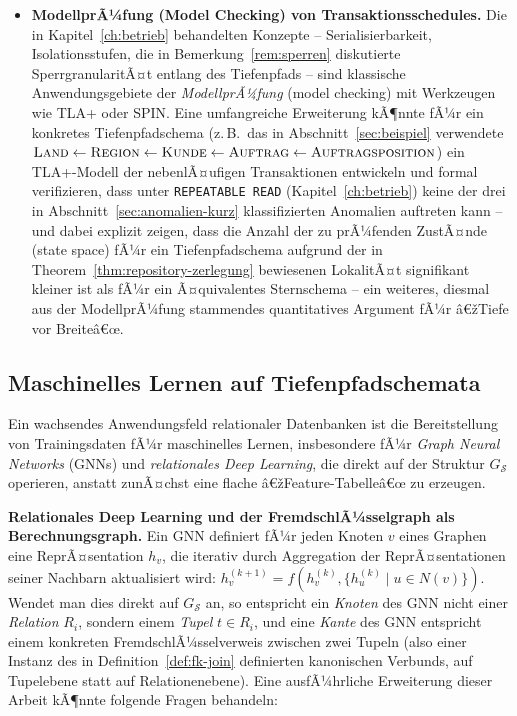 ﻿\documentclass[a4paper,12pt]{report}
\theoremstyle{definition}
\theoremstyle{remark}
\begin{document}
\begin{itemize}
  \item \textbf{ModellprÃ¼fung (Model Checking) von
    Transaktionsschedules.} Die in Kapitel~\ref{ch:betrieb}
    behandelten Konzepte -- Serialisierbarkeit, Isolationsstufen,
    die in Bemerkung~\ref{rem:sperren} diskutierte
    SperrgranularitÃ¤t entlang des Tiefenpfads -- sind klassische
    Anwendungsgebiete der \emph{ModellprÃ¼fung} (model checking) mit
    Werkzeugen wie TLA+ oder SPIN. Eine umfangreiche Erweiterung
    kÃ¶nnte fÃ¼r ein konkretes Tiefenpfadschema (z.\,B.\ das in
    Abschnitt~\ref{sec:beispiel} verwendete
    $\textsc{Land}\leftarrow\textsc{Region}\leftarrow\textsc{Kunde}
    \leftarrow\textsc{Auftrag}\leftarrow\textsc{Auftragsposition}$)
    ein TLA+-Modell der nebenlÃ¤ufigen Transaktionen entwickeln und
    formal verifizieren, dass unter \texttt{REPEATABLE READ}
    (Kapitel~\ref{ch:betrieb}) keine der drei in
    Abschnitt~\ref{sec:anomalien-kurz} klassifizierten Anomalien
    auftreten kann -- und dabei explizit zeigen, dass die Anzahl der
    zu prÃ¼fenden ZustÃ¤nde (state space) fÃ¼r ein Tiefenpfadschema
    aufgrund der in Theorem~\ref{thm:repository-zerlegung} bewiesenen
    LokalitÃ¤t signifikant kleiner ist als fÃ¼r ein Ã¤quivalentes
    Sternschema -- ein weiteres, diesmal aus der ModellprÃ¼fung
    stammendes quantitatives Argument fÃ¼r â€žTiefe vor Breiteâ€œ.
\end{itemize}

\subsection{Maschinelles Lernen auf Tiefenpfadschemata}
\label{sec:ausblick-ml}

Ein wachsendes Anwendungsfeld relationaler Datenbanken ist die
Bereitstellung von Trainingsdaten fÃ¼r maschinelles Lernen,
insbesondere fÃ¼r \emph{Graph Neural Networks} (GNNs) und
\emph{relationales Deep Learning}, die direkt auf der Struktur
$G_{\mathcal{S}}$ operieren, anstatt zunÃ¤chst eine flache
â€žFeature-Tabelleâ€œ zu erzeugen.

\textbf{Relationales Deep Learning und der FremdschlÃ¼sselgraph als
Berechnungsgraph.} Ein GNN definiert fÃ¼r jeden Knoten $v$ eines
Graphen eine ReprÃ¤sentation $h_v$, die iterativ durch Aggregation der
ReprÃ¤sentationen seiner Nachbarn aktualisiert wird:
$h_v^{(k+1)} = f(h_v^{(k)}, \{h_u^{(k)} \mid u \in
N(v)\})$. Wendet man dies direkt auf $G_{\mathcal{S}}$ an, so
entspricht ein \emph{Knoten} des GNN nicht einer \emph{Relation}
$R_i$, sondern einem \emph{Tupel} $t\in R_i$, und eine
\emph{Kante} des GNN entspricht einem konkreten FremdschlÃ¼sselverweis
zwischen zwei Tupeln (also einer Instanz des in
Definition~\ref{def:fk-join} definierten kanonischen Verbunds, auf
Tupelebene statt auf Relationenebene). Eine ausfÃ¼hrliche Erweiterung
dieser Arbeit kÃ¶nnte folgende Fragen behandeln:
\end{document}
